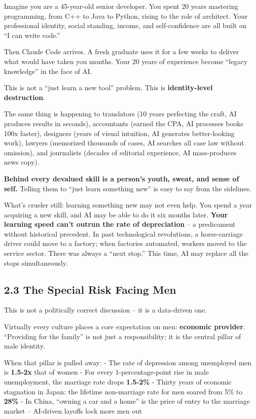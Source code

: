 Imagine you are a 45-year-old senior developer. You spent 20 years
mastering programming, from C++ to Java to Python, rising to the role of
architect. Your professional identity, social standing, income, and
self-confidence are all built on ``I can write code.''

Then Claude Code arrives. A fresh graduate uses it for a few weeks to
deliver what would have taken you months. Your 20 years of experience
become ``legacy knowledge'' in the face of AI.

This is not a ``just learn a new tool'' problem. This is
\textbf{identity-level destruction}.

The same thing is happening to translators (10 years perfecting the
craft, AI produces results in seconds), accountants (earned the CPA, AI
processes books 100x faster), designers (years of visual intuition, AI
generates better-looking work), lawyers (memorized thousands of cases,
AI searches all case law without omission), and journalists (decades of
editorial experience, AI mass-produces news copy).

\textbf{Behind every devalued skill is a person's youth, sweat, and
sense of self.} Telling them to ``just learn something new'' is easy to
say from the sidelines.

What's crueler still: learning something new may not even help. You
spend a year acquiring a new skill, and AI may be able to do it six
months later. \textbf{Your learning speed can't outrun the rate of
depreciation} -- a predicament without historical precedent. In past
technological revolutions, a horse-carriage driver could move to a
factory; when factories automated, workers moved to the service sector.
There was always a ``next stop.'' This time, AI may replace all the
stops simultaneously.

\subsection{2.3 The Special Risk Facing
Men}\label{the-special-risk-facing-men}

This is not a politically correct discussion -- it is a data-driven one.

Virtually every culture places a core expectation on men:
\textbf{economic provider}. ``Providing for the family'' is not just a
responsibility; it is the central pillar of male identity.

When that pillar is pulled away: - The rate of depression among
unemployed men is \textbf{1.5-2x} that of women - For every
1-percentage-point rise in male unemployment, the marriage rate drops
\textbf{1.5-2\%} - Thirty years of economic stagnation in Japan: the
lifetime non-marriage rate for men soared from 5\% to \textbf{28\%} - In
China, ``owning a car and a home'' is the price of entry to the marriage
market -- AI-driven layoffs lock more men out

